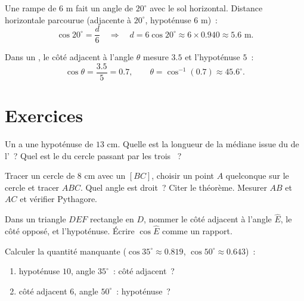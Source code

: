 \begin{example}\label{ex:g8:cosine:side}
Une rampe de $6$ m fait un angle de $20^\circ$ avec le sol horizontal.
Distance horizontale parcourue (adjacente à $20^\circ$, hypoténuse
$6$ m)~:
\[
\cos 20^\circ = \frac{d}{6}
\quad\Longrightarrow\quad
d = 6 \cos 20^\circ \approx 6 \times 0.940 \approx 5.6 \text{ m}.
\]
\end{example}

\begin{example}\label{ex:g8:cosine:angle}
Dans un , le côté adjacent à l'angle $\theta$
mesure $3.5$ et l'hypoténuse $5$~:
\[
\cos\theta = \frac{3.5}{5} = 0.7,
\qquad
\theta = \cos^{-1}(0.7) \approx 45.6^\circ .
\]
\end{example}

\section{Exercices}

\begin{exercise}[$\star$]\label{exo:g8:cosine:1}
Un  a une hypoténuse de $13$ cm. Quelle est la
longueur de la médiane issue du  de l'~? Quel est le
 du cercle passant par les trois ~?
\end{exercise}

\begin{exercise}[$\star$]\label{exo:g8:cosine:2}
Tracer un cercle de  $8$ cm avec un  $[BC]$, choisir
un point $A$ quelconque sur le cercle et tracer $ABC$. Quel angle est
droit~? Citer le théorème. Mesurer $AB$ et $AC$ et vérifier
Pythagore.
\end{exercise}

\begin{exercise}[$\star$]\label{exo:g8:cosine:3}
Dans un triangle $DEF$ rectangle en $D$, nommer le côté adjacent à
l'angle $\widehat E$, le côté opposé, et l'hypoténuse. Écrire
$\cos \widehat E$ comme un rapport.
\end{exercise}

\begin{exercise}[$\star$]\label{exo:g8:cosine:4}
Calculer la quantité manquante ($\cos 35^\circ \approx 0.819$,
$\cos 50^\circ \approx 0.643$)~:
\begin{enumerate}
  \item hypoténuse $10$, angle $35^\circ$~: côté adjacent~?
  \item côté adjacent $6$, angle $50^\circ$~: hypoténuse~?
\end{enumerate}
\end{exercise}

